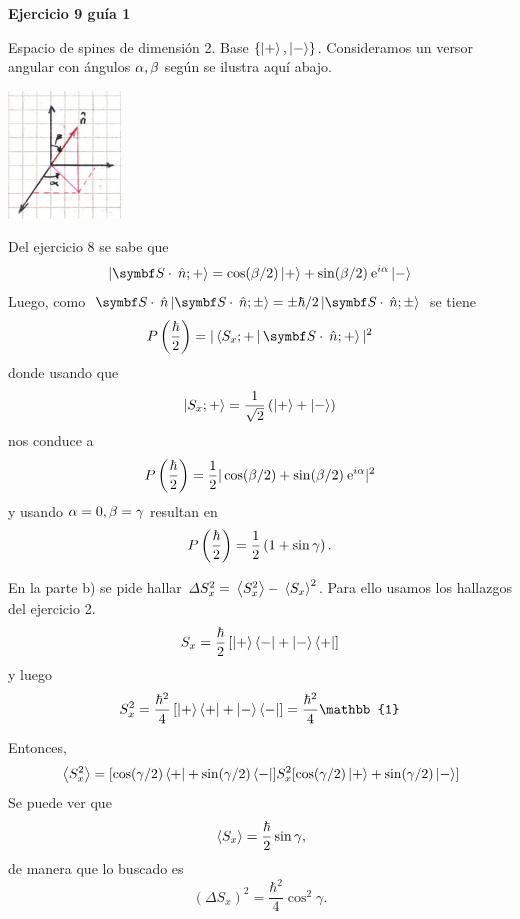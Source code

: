 \documentclass[10pt,oneside]{CBFT_book}
\begin{document}
\begin{ejemplo}{\bf Ejercicio 9 guía 1}

Espacio de spines de dimensión 2. Base $\{ \Ket{+}, \Ket{-} \}$.
Consideramos un versor angular con ángulos $\alpha, \beta$ según se ilustra aquí abajo.

\includegraphics[width=0.225\textwidth]{images/fig_ft2_ejercicio91.jpg}

Del ejercicio 8 se sabe que
\[
	\Ket{\vb S\cdot\nver; +} = \cos(\b/2) \Ket{+} + \sin(\b/2) \euler^{i\a} \Ket{-}
\]
Luego, como $ \vb S\cdot\nver \Ket{\vb S\cdot\nver; \pm} = \pm \hbar/2 \Ket{\vb S\cdot\nver; \pm } $ 
se tiene
\[
	P\Frac{\hbar}{2} = |\Braket{S_x;+| \vb S\cdot\nver ; +}|^2
\]
donde usando que 
\[
	\Ket{S_x;+} = \frac{1}{\sqrt{2}} \left( \Ket{+} + \Ket{-} \right)
\]
nos conduce a
\[
	P\left( \frac{ \hbar }{ 2 } \right) = \frac{1}{2} | \cos(\beta/2) + \sin(\beta/2) \:\mathrm{e}^{i\alpha} |^2
\] 
y usando $\alpha=0, \beta=\gamma $ resultan en
\[
	P\left( \frac{ \hbar }{ 2 } \right) = \frac{1}{2} \left( 1 + \sin\gamma \right).
\]

En la parte b) se pide hallar $\Delta S_x^2 = \:\left\langle S_x^2 \right\rangle- \:\left\langle S_x \right\rangle^2 $. Para ello
usamos los hallazgos del ejercicio 2.
\[
	S_x = \frac{\hbar}{2} \left[ \Ket{+}\Bra{-} + \Ket{-}\Bra{+} \right]
\] 
y luego
\[
	S_x^2 = \frac{\hbar^2}{4}\left[ \KB{+}{+} + \KB{-}{-} \right] = 
	\frac{\hbar^2}{4}\mathbb{1}
\]

Entonces,
\[
	\:\left\langle S_x^2 \right\rangle = [ \cos(\gamma/2) \Bra{+} + \sin(\gamma/2) \Bra{-} ] S_x^2
	[ \cos(\gamma/2) \Ket{+} + \sin(\gamma/2) \Ket{-} ]
\]
Se puede ver que
\[
	\:\left\langle S_x \right\rangle = \frac{\hbar}{2} \sin\gamma,
\]
de manera que lo buscado es
\[
	(\Delta S_x)^2 = \frac{\hbar^2}{4} \cos^2\gamma.
\]
 
 
\end{ejemplo}
\end{document}

